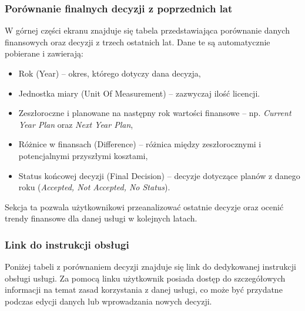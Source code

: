 \subsubsection{Porównanie finalnych decyzji z poprzednich lat}
W górnej części ekranu znajduje się tabela przedstawiająca porównanie danych finansowych oraz decyzji z trzech ostatnich lat. Dane te są automatycznie pobierane i zawierają:
\begin{itemize}
    \item {Rok (Year)} -- okres, którego dotyczy dana decyzja,
    \item {Jednostka miary (Unit Of Measurement)} -- zazwyczaj ilość licencji. 
    \item {Zeszłoroczne i planowane na następny rok wartości finansowe} -- np. \textit{Current Year Plan} oraz \textit{Next Year Plan},
    \item {Różnice w finansach (Difference)} -- różnica między zeszłorocznymi i potencjalnymi przyszłymi kosztami,
    \item {Status końcowej decyzji (Final Decision)} -- decyzje dotyczące planów z danego roku (\textit{Accepted, Not Accepted, No Status}).
\end{itemize}

Sekcja ta pozwala użytkownikowi przeanalizować ostatnie decyzje oraz ocenić trendy finansowe dla danej usługi w kolejnych latach.

\subsubsection{Link do instrukcji obsługi}
Poniżej tabeli z porównaniem decyzji znajduje się link do dedykowanej instrukcji obsługi usługi. Za pomocą linku użytkownik posiada dostęp do szczegółowych informacji na temat zasad korzystania z danej usługi, co może być przydatne podczas edycji danych lub wprowadzania nowych decyzji.

